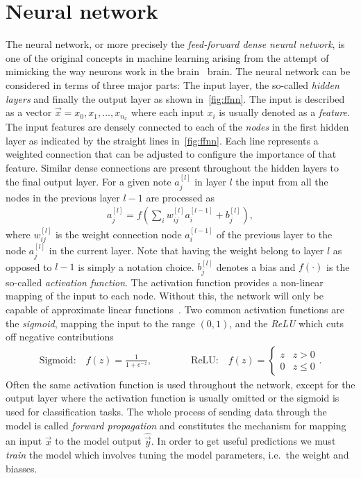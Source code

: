 \section{Neural network}\label{sec:NN}
The neural network, or more precisely the \textit{feed-forward dense neural
network}, is one of the original concepts in machine learning arising from the attempt of mimicking the way neurons work in the
brain~\cite{lederer2021activation, Shankar_2022} brain. The neural network can
be considered in terms of three major parts: The input layer, the so-called
\textit{hidden layers} and finally the output layer as shown in~\cref{fig:ffnn}.
The input is described as a vector $\vec{x} = x_0, x_1, \ldots, x_{n_x}$ where
each input $x_i$ is usually denoted as a \textit{feature}. The input features
are densely connected to each of the \textit{nodes} in the first hidden layer as
indicated by the straight lines in~\cref{fig:ffnn}. Each line represents a weighted connection that can be adjusted to configure the importance of that
feature. Similar dense connections are present throughout the hidden layers to
the final output layer. For a given note $a_j^{[l]}$ in layer $l$ the input from
all the nodes in the previous layer $l-1$ are processed as
\begin{align*}
  a_j^{[l]} = f\left(\sum_i w^{[l]}_{ij}a_i^{[l-1]} + b_j^{[l]}\right),
\end{align*}
where $w^{[l]}_{ij}$ is the weight connection node $a_i^{[l-1]}$ of the previous layer to the node $a_j^{[l]}$ in the current layer. Note that having the weight belong to layer $l$ as opposed to $l-1$ is simply a notation choice. $b_j^{[l]}$ denotes a bias and $f(\cdot)$ is the so-called \textit{activation function}. The activation function provides a non-linear mapping of the input to each node. Without this, the network will only be capable of approximate linear functions~\cite{lederer2021activation}. Two common activation functions are the \textit{sigmoid}, mapping the input to the range $(0,1)$, and the \textit{ReLU} which cuts off negative contributions
\begin{align*}
  \text{Sigmoid:} \quad f(z) = \frac{1}{1 + e^{-z}}, \qquad \qquad
  \text{ReLU:} \quad 
  f(z)= \begin{cases}
    z & z > 0   \\
    0 & z \leq 0
    \end{cases}.
\end{align*}
Often the same activation function is used throughout the network, except for the output layer where the activation function is usually omitted or the sigmoid is used for classification tasks. The whole process of sending data through the model is called \textit{forward propagation} and constitutes the mechanism for mapping an input $\vec{x}$ to the model output $\hat{\vec{y}}$. In order to get useful predictions we must \textit{train} the model which involves tuning the model parameters, i.e.\ the weight and biasses.
